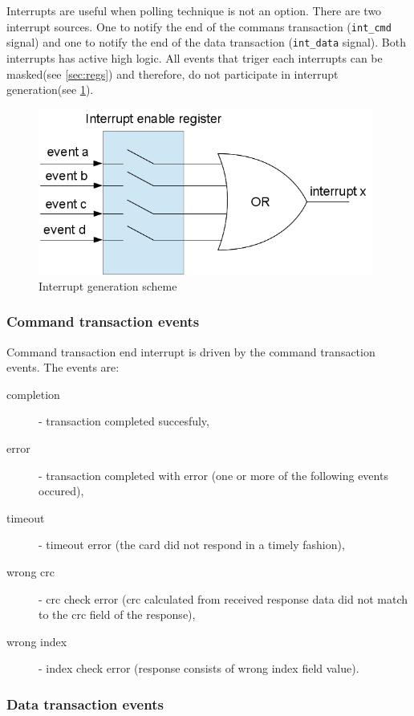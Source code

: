     Interrupts are useful when polling technique is not an option. There are two interrupt sources. One to notify the end of the commans transaction (\texttt{int\_cmd} signal) and
    one to notify the end of the data transaction (\texttt{int\_data} signal). Both interrupts has active high logic. All events that triger each interrupts can be masked(see \ref{sec:regs})
    and therefore, do not participate in interrupt generation(see \ref{img:events}).
    \begin{figure}[H]
        \centering
        \includegraphics[width=11cm]{../bin/events.png}
        \caption{Interrupt generation scheme}
        \label{img:events}
    \end{figure}
    
    \subsubsection{Command transaction events}
    \label{sec:cmd_events}

    Command transaction end interrupt is driven by the command transaction events. The events are:
    \begin{description}
    \item[completion] - transaction completed succesfuly,
    \item[error] - transaction completed with error (one or more of the following events occured),
    \item[timeout] - timeout error (the card did not respond in a timely fashion),
    \item[wrong crc] - crc check error (crc calculated from received response data did not match to the crc field of the response),
    \item[wrong index] - index check error (response consists of wrong index field value).
    \end{description}
    
    \subsubsection{Data transaction events}
    \label{sec:data_events}

